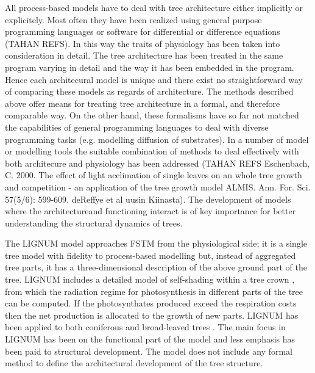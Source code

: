All  process-based models \citep{landsberg:86} have  to deal with tree
architecture either  implicitly or explicitely.  Most  often they have
been realized using  general purpose programming languages or software
for differential  or difference equations  (TAHAN REFS).  In  this way
the traits of physiology has  been taken into consideration in detail. 
The tree architecture has been treated in the  same program varying in
detail and  the way it has  been embedded in  the  program. Hence each
architecural model is unique and there exist no straightforward way of
comparing these models as     regards of architecture.   The   methods
described above offer means   for  treating  tree architecture  in   a
formal, and therefore comparable   way.    On the other  hand,   these
formalisms  have    so far not   matched  the  capabilities of general
programming  languages to deal  with  diverse programming  tasks (e.g. 
modelling diffusion of substrates). In  a number of model or modelling
tools the suitable combination   of methods to deal  effectively  with
both architecure  and physiology   has   been addressed (TAHAN    REFS
Eschenbach, C. 2000. The effect of  light acclimation of single leaves
on an whole tree  growth and competition  - an application of the tree
growth   model  ALMIS.    Ann.      For.    Sci.    57(5/6):  599-609. 
\citet{karwowski:03,kurth:99}   deReffye et al   uusin Kiinasta).  The
development of  models where the  architectureand functioning interact
is of key importance for  better understanding the structural dynamics
of trees.

The LIGNUM model approaches FSTM  from the physiological side; it is a
single tree model  \citep{perttunen:96} with fidelity to process-based
modelling  \citep[see  e.g.][]{nikinmaa:92, sievanen:93,  makela:97-1}
but,  instead of  aggregated tree  parts, it  has  a three-dimensional
description of the  above ground part of the  tree.  LIGNUM includes a
detailed    model    of    self-shading    within   a    tree    crown
\citep{perttunen:96,  perttunen:01}, from  which the  radiation regime
for photosynthesis in different parts of the tree can be computed.  If
the photosynthates produced exceed  the respiration costs then the net
production is allocated  to the growth of new  parts.  LIGNUM has been
applied to both coniferous \citep{perttunen:96,lo:99} and broad-leaved
trees \citep{perttunen:01}.  The main focus  in LIGNUM has been on the
functional  part of  the  model and  less  emphasis has  been paid  to
structural development.  The model  does not include any formal method
to define the architectural development of the tree structure.

